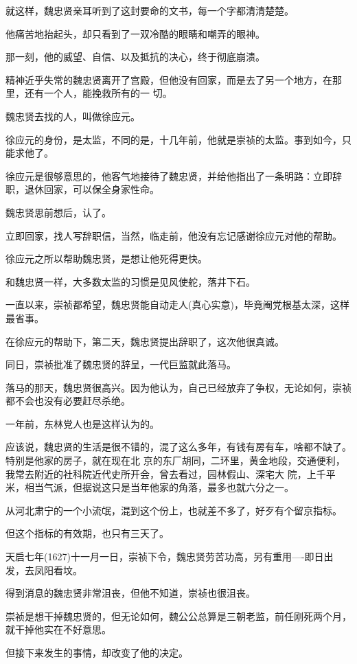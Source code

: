 \documentclass[11pt,a4paper,onecolumn]{article}
\begin{document}
就这样，魏忠贤亲耳听到了这封要命的文书，每一个字都清清楚楚。

他痛苦地抬起头，却只看到了一双冷酷的眼睛和嘲弄的眼神。

那一刻，他的威望、自信、以及抵抗的决心，终于彻底崩溃。

精神近乎失常的魏忠贤离开了宫殿，但他没有回家，而是去了另一个地方，在那里，还有一个人，能挽救所有的一
切。

魏忠贤去找的人，叫做徐应元。

徐应元的身份，是太监，不同的是，十几年前，他就是崇祯的太监。事到如今，只能求他了。

徐应元是很够意思的，他客气地接待了魏忠贤，并给他指出了一条明路：立即辞职，退休回家，可以保全身家性命。

魏忠贤思前想后，认了。

立即回家，找人写辞职信，当然，临走前，他没有忘记感谢徐应元对他的帮助。

徐应元之所以帮助魏忠贤，是想让他死得更快。

和魏忠贤一样，大多数太监的习惯是见风使舵，落井下石。

一直以来，崇祯都希望，魏忠贤能自动走人(真心实意)，毕竟阉党根基太深，这样最省事。

在徐应元的帮助下，第二天，魏忠贤提出辞职了，这次他很真诚。

同日，崇祯批准了魏忠贤的辞呈，一代巨监就此落马。

落马的那天，魏忠贤很高兴。因为他认为，自己已经放弃了争权，无论如何，崇祯都不会也没有必要赶尽杀绝。

一年前，东林党人也是这样认为的。

应该说，魏忠贤的生活是很不错的，混了这么多年，有钱有房有车，啥都不缺了。特别是他家的房子，就在现在北
京的东厂胡同，二环里，黄金地段，交通便利，我常去附近的社科院近代史所开会，曾去看过，园林假山、深宅大
院，上千平米，相当气派，但据说这只是当年他家的角落，最多也就六分之一。

从河北肃宁的一个小流氓，混到这个份上，也就差不多了，好歹有个留京指标。

但这个指标的有效期，也只有三天了。

天启七年(1627)十一月一日，崇祯下令，魏忠贤劳苦功高，另有重用----即日出发，去凤阳看坟。

得到消息的魏忠贤非常沮丧，但他不知道，崇祯也很沮丧。

崇祯是想干掉魏忠贤的，但无论如何，魏公公总算是三朝老监，前任刚死两个月，就干掉他实在不好意思。

但接下来发生的事情，却改变了他的决定。

\section[\thesection]{}
\end{document}
